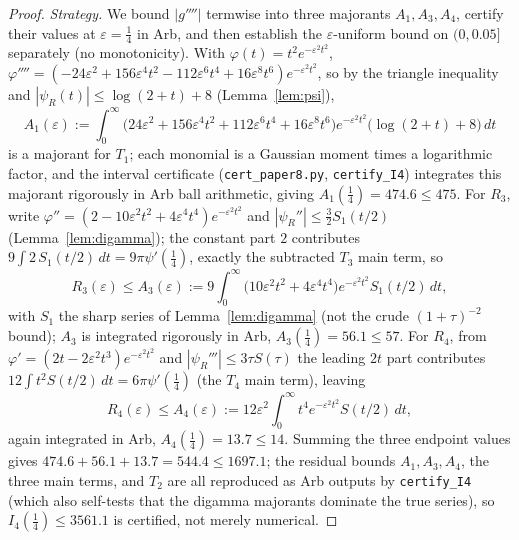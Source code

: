 \documentclass[11pt]{article}
\newcommand{\psiR}{\psi_{R}}                %
\begin{document}
\begin{proof}
\emph{Strategy.} We bound $|g''''|$ termwise into three majorants $A_1,A_3,A_4$,
certify their values at $\varepsilon=\tfrac14$ in Arb, and then establish the
$\varepsilon$-uniform bound on $(0,0.05]$ separately (no monotonicity).
With $\varphi(t)=t^2e^{-\varepsilon^2 t^2}$,
$\varphi''''=(-24\varepsilon^2+156\varepsilon^4t^2-112\varepsilon^6t^4
+16\varepsilon^8t^6)e^{-\varepsilon^2t^2}$, so by the triangle inequality and
$|\psiR(t)|\le\log(2+t)+8$ (Lemma~\ref{lem:psi}),
\[
A_1(\varepsilon):=\!\int_0^\infty\!\!\bigl(24\varepsilon^2+156\varepsilon^4t^2
+112\varepsilon^6t^4+16\varepsilon^8t^6\bigr)e^{-\varepsilon^2t^2}
\bigl(\log(2+t)+8\bigr)\,dt
\]
is a majorant for $T_1$; each monomial is a Gaussian moment times a
logarithmic factor, and the interval certificate
(\texttt{cert\_paper8.py}, \texttt{certify\_I4}) integrates this majorant
rigorously in Arb ball arithmetic, giving $A_1(\tfrac14)=474.6\le 475$. For $R_3$, write
$\varphi''=(2-10\varepsilon^2t^2+4\varepsilon^4t^4)e^{-\varepsilon^2t^2}$ and
$|\psiR''|\le\tfrac32 S_1(t/2)$ (Lemma~\ref{lem:digamma}); the constant part
$2$ contributes $9\!\int 2\,S_1(t/2)\,dt=9\pi\psi'(\tfrac14)$, exactly the
subtracted $T_3$ main term, so
\[
R_3(\varepsilon)\le A_3(\varepsilon):=9\!\int_0^\infty\!\!
\bigl(10\varepsilon^2t^2+4\varepsilon^4t^4\bigr)e^{-\varepsilon^2t^2}
S_1(t/2)\,dt,
\]
with $S_1$ the sharp series of Lemma~\ref{lem:digamma} (not the crude
$(1+\tau)^{-2}$ bound); $A_3$ is integrated rigorously in Arb,
$A_3(\tfrac14)=56.1\le 57$. For $R_4$, from
$\varphi'=(2t-2\varepsilon^2t^3)e^{-\varepsilon^2t^2}$ and
$|\psiR'''|\le 3\tau S(\tau)$ the leading $2t$ part contributes
$12\!\int t^2 S(t/2)\,dt=6\pi\psi'(\tfrac14)$ (the $T_4$ main term), leaving
\[
R_4(\varepsilon)\le A_4(\varepsilon):=12\varepsilon^2\!\int_0^\infty\!\!
t^4 e^{-\varepsilon^2t^2}S(t/2)\,dt,
\]
again integrated in Arb, $A_4(\tfrac14)=13.7\le 14$. Summing the three
endpoint values gives $474.6+56.1+13.7=544.4\le1697.1$; the residual bounds
$A_1,A_3,A_4$, the three main terms, and $T_2$ are all reproduced as Arb
outputs by \texttt{certify\_I4} (which also self-tests that the digamma
majorants dominate the true series), so $I_4(\tfrac14)\le3561.1$ is certified,
not merely numerical.


\end{proof}
\end{document}
